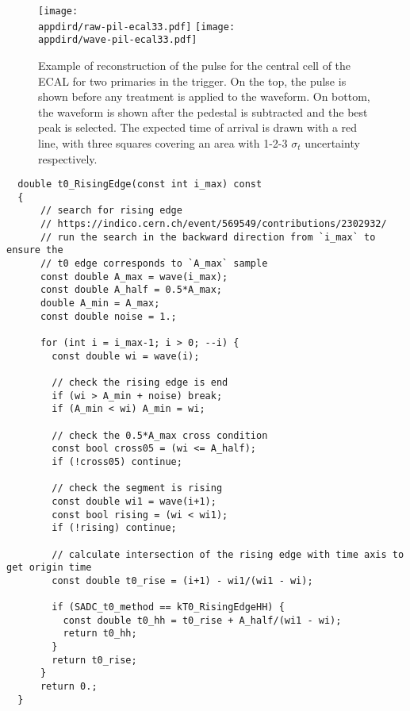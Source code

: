 \begin{figure}[bth!]
  \centering
  \texttt{[image: \\appdird/raw-pil-ecal33.pdf]}
  \texttt{[image: \\appdird/wave-pil-ecal33.pdf]}    
  \caption[example of pulse reconstruction in NA64]{Example of reconstruction of the pulse for the central cell of the ECAL for two primaries in the trigger. On the top, the pulse is shown before any treatment is applied to the waveform. On bottom, the waveform is shown after the pedestal is subtracted and the best peak is selected. The expected time of arrival is drawn with a red line, with three squares covering an area with 1-2-3 $\sigma_t$ uncertainty respectively.}
  \label{fig:pulse-example-pileup}
\end{figure}
\clearpage
\newpage
\FloatBarrier
\begin{lstlisting}
  double t0_RisingEdge(const int i_max) const
  {      
      // search for rising edge
      // https://indico.cern.ch/event/569549/contributions/2302932/
      // run the search in the backward direction from `i_max` to ensure the
      // t0 edge corresponds to `A_max` sample
      const double A_max = wave(i_max);
      const double A_half = 0.5*A_max;
      double A_min = A_max;
      const double noise = 1.;
      
      for (int i = i_max-1; i > 0; --i) {
        const double wi = wave(i);
        
        // check the rising edge is end
        if (wi > A_min + noise) break;
        if (A_min < wi) A_min = wi;
        
        // check the 0.5*A_max cross condition
        const bool cross05 = (wi <= A_half);
        if (!cross05) continue;
        
        // check the segment is rising
        const double wi1 = wave(i+1);
        const bool rising = (wi < wi1);
        if (!rising) continue;
        
        // calculate intersection of the rising edge with time axis to get origin time
        const double t0_rise = (i+1) - wi1/(wi1 - wi);
        
        if (SADC_t0_method == kT0_RisingEdgeHH) {
          const double t0_hh = t0_rise + A_half/(wi1 - wi);
          return t0_hh;
        }
        return t0_rise;
      }
      return 0.;
  }
\end{lstlisting}

